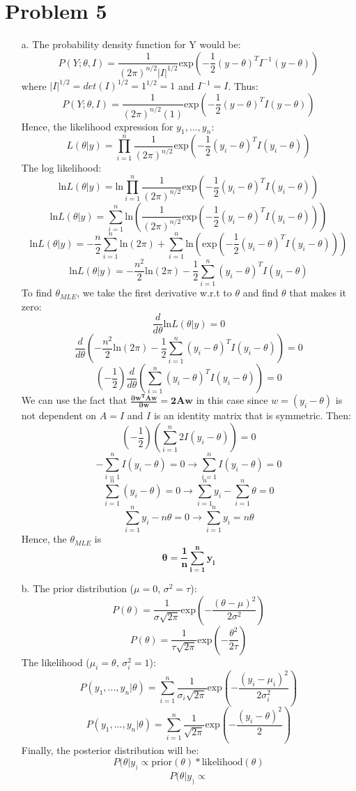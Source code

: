 \documentclass[twoside]{homework}
\begin{document}
\section*{Problem 5}
\begin{itemize}
    \item [a.] The probability density function for Y would be:
    $$P(Y;\theta,I)=\frac{1}{(2\pi)^{n/2}|I|^{1/2}}\text{exp}(-\frac{1}{2}(y-\theta)^TI^{-1}(y-\theta))$$
    where $|I|^{1/2}=det(I)^{1/2}=1^{1/2}=1$ and $I^{-1}=I$. Thus:
    $$P(Y;\theta,I)=\frac{1}{(2\pi)^{n/2}(1)}\text{exp}(-\frac{1}{2}(y-\theta)^TI(y-\theta))$$
    Hence, the likelihood expression for $y_1, ...,y_n$:
    $$L(\theta|y)=\prod_{i=1}^n\frac{1}{(2\pi)^{n/2}}\text{exp}(-\frac{1}{2}(y_i-\theta)^TI(y_i-\theta))$$
    The log likelihood:
    $$\text{ln}L(\theta|y)=\text{ln}\prod_{i=1}^n\frac{1}{(2\pi)^{n/2}}\text{exp}(-\frac{1}{2}(y_i-\theta)^TI(y_i-\theta))$$
    $$\text{ln}L(\theta|y)=\sum_{i=1}^n\text{ln}(\frac{1}{(2\pi)^{n/2}}\text{exp}(-\frac{1}{2}(y_i-\theta)^TI(y_i-\theta)))$$
    $$\text{ln}L(\theta|y)=-\frac{n}{2}\sum_{i=1}^n\text{ln}(2\pi)+\sum_{i=1}^n\text{ln}(\text{exp}(-\frac{1}{2}(y_i-\theta)^TI(y_i-\theta)))$$
    $$\text{ln}L(\theta|y)=-\frac{n^2}{2}\text{ln}(2\pi)-\frac{1}{2}\sum_{i=1}^n(y_i-\theta)^TI(y_i-\theta)$$
    To find $\theta_{MLE}$, we take the first derivative w.r.t to $\theta$ and find $\theta$ that makes it zero:
    $$\frac{d}{d\theta}\text{ln}L(\theta|y)=0$$
    $$\frac{d}{d\theta}(-\frac{n^2}{2}\text{ln}(2\pi)-\frac{1}{2}\sum_{i=1}^n(y_i-\theta)^TI(y_i-\theta))=0$$
    $$(-\frac{1}{2})\frac{d}{d\theta}(\sum_{i=1}^n(y_i-\theta)^TI(y_i-\theta))=0$$
    We can use the fact that $\mathbf{ \frac{\partial w^T A w}{\partial w} = 2Aw}$ in this case since $w=(y_i-\theta)$ is not dependent on $A=I$ and $I$ is an identity matrix that is symmetric. Then:
    $$(-\frac{1}{2})(\sum_{i=1}^n2I(y_i-\theta))=0$$
    $$-\sum_{i=1}^nI(y_i-\theta)=0 \xrightarrow{} \sum_{i=1}^nI(y_i-\theta)=0$$
    $$\sum_{i=1}^n(y_i-\theta)=0 \xrightarrow{} \sum_{i=1}^ny_i-\sum_{i=1}^n\theta=0$$
    $$\sum_{i=1}^ny_i-n\theta=0 \xrightarrow{} \sum_{i=1}^ny_i=n\theta$$
    Hence, the $\theta_{MLE}$ is
    $$\boldsymbol{\theta=\frac{1}{n}\sum_{i=1}^ny_i}$$
    \item [b.] The prior distribution ($\mu=0$, $\sigma^2=\tau$):
    $$P(\theta)=\frac{1}{\sigma\sqrt{2\pi}}\text{exp}(-\frac{(\theta-\mu)^2}{2\sigma^2})$$
    $$P(\theta)=\frac{1}{\tau\sqrt{2\pi}}\text{exp}(-\frac{\theta^2}{2\tau})$$
    The likelihood ($\mu_i=\theta$, $\sigma_i^2=1$):
    $$P(y_1,...,y_n|\theta)=\sum_{i=1}^n\frac{1}{\sigma_i\sqrt{2\pi}}\text{exp}(-\frac{(y_i-\mu_i)^2}{2\sigma_i^2})$$
    $$P(y_1,...,y_n|\theta)=\sum_{i=1}^n\frac{1}{\sqrt{2\pi}}\text{exp}(-\frac{(y_i-\theta)^2}{2})$$
    Finally, the posterior distribution will be:
    $$P(\theta|y_)\propto\text{prior}(\theta)*\text{likelihood}(\theta)$$
    $$P(\theta|y_)\propto$$
\end{itemize}
\end{document}
